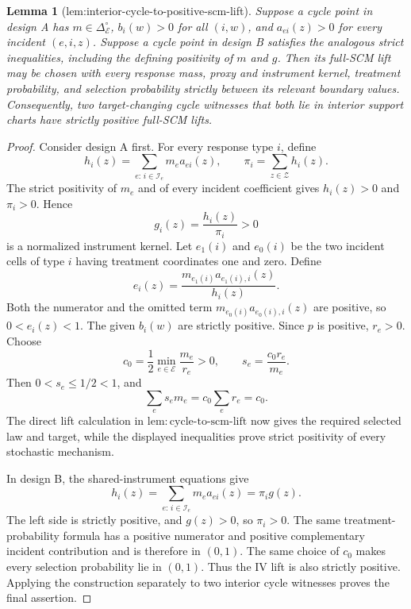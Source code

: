 \documentclass{article}
\newtheorem{lemma}{Lemma}
\begin{document}
\begin{lemma}[lem:interior-cycle-to-positive-scm-lift]\label{lem:interior-cycle-to-positive-scm-lift}
Suppose a cycle point in design A has \(m\in\Delta_{\mathcal E}^{\circ}\), \(b_i(w)>0\) for all \((i,w)\), and \(a_{ei}(z)>0\) for every incident \((e,i,z)\).  Suppose a cycle point in design B satisfies the analogous strict inequalities, including the defining positivity of \(m\) and \(g\).  Then its full-SCM lift may be chosen with every response mass, proxy and instrument kernel, treatment probability, and selection probability strictly between its relevant boundary values.  Consequently, two target-changing cycle witnesses that both lie in interior support charts have strictly positive full-SCM lifts.
\end{lemma}
\begin{proof}
Consider design A first.  For every response type \(i\), define
\[
h_i(z)=\sum_{e:\,i\in\mathcal I_e}m_ea_{ei}(z),
\qquad
\pi_i=\sum_{z\in\mathcal Z}h_i(z).
\]
The strict positivity of \(m_e\) and of every incident coefficient gives \(h_i(z)>0\) and \(\pi_i>0\).  Hence
\[
g_i(z)=\frac{h_i(z)}{\pi_i}>0
\]
is a normalized instrument kernel.  Let \(e_1(i)\) and \(e_0(i)\) be the two incident cells of type \(i\) having treatment coordinates one and zero.  Define
\[
e_i(z)=\frac{m_{e_1(i)}a_{e_1(i),i}(z)}{h_i(z)}.
\]
Both the numerator and the omitted term \(m_{e_0(i)}a_{e_0(i),i}(z)\) are positive, so \(0<e_i(z)<1\).  The given \(b_i(w)\) are strictly positive.  Since \(p\) is positive, \(r_e>0\).  Choose
\[
c_0=\frac12\min_{e\in\mathcal E}\frac{m_e}{r_e}>0,
\qquad
s_e=\frac{c_0r_e}{m_e}.
\]
Then \(0<s_e\le1/2<1\), and
\[
\sum_e s_em_e=c_0\sum_er_e=c_0.
\]
The direct lift calculation in \(\mathrm{lem:cycle\text{-}to\text{-}scm\text{-}lift}\) now gives the required selected law and target, while the displayed inequalities prove strict positivity of every stochastic mechanism.

In design B, the shared-instrument equations give
\[
h_i(z)=\sum_{e:\,i\in\mathcal I_e}m_ea_{ei}(z)=\pi_i g(z).
\]
The left side is strictly positive, and \(g(z)>0\), so \(\pi_i>0\).  The same treatment-probability formula has a positive numerator and positive complementary incident contribution and is therefore in \((0,1)\).  The same choice of \(c_0\) makes every selection probability lie in \((0,1)\).  Thus the IV lift is also strictly positive.  Applying the construction separately to two interior cycle witnesses proves the final assertion.
\end{proof}
\end{document}
